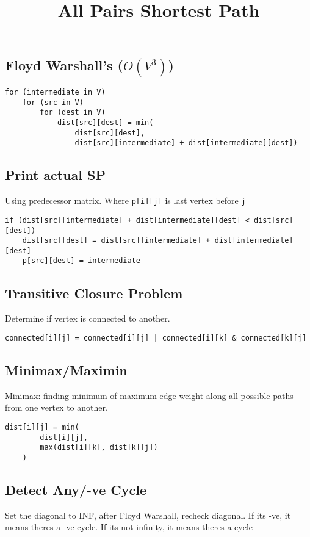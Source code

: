 \documentclass[12pt]{article}
\title{\textbf{All Pairs Shortest Path}}
\date{}
\begin{document}
\maketitle

\begin{spacing}{1.5}

\section{Floyd Warshall's ($O(V^3)$)}

\begin{verbatim}
for (intermediate in V)
    for (src in V)
        for (dest in V)
            dist[src][dest] = min(
                dist[src][dest], 
                dist[src][intermediate] + dist[intermediate][dest])
\end{verbatim}

\subsection{Print actual SP}

Using predecessor matrix. Where \texttt{p[i][j]} is last vertex before \texttt{j}

\begin{verbatim}
if (dist[src][intermediate] + dist[intermediate][dest] < dist[src][dest])
    dist[src][dest] = dist[src][intermediate] + dist[intermediate][dest]
    p[src][dest] = intermediate
\end{verbatim}

\subsection{Transitive Closure Problem}

Determine if vertex is connected to another. 

\begin{verbatim}
connected[i][j] = connected[i][j] | connected[i][k] & connected[k][j]
\end{verbatim}

\subsection{Minimax/Maximin}

Minimax: finding minimum of maximum edge weight along all possible paths from one vertex to another. 

\begin{verbatim}
dist[i][j] = min(
        dist[i][j],
        max(dist[i][k], dist[k][j])
    )
\end{verbatim}

\subsection{Detect Any/-ve Cycle}

Set the diagonal to INF, after Floyd Warshall, recheck diagonal. If its -ve, it means theres a -ve cycle. If its not infinity, it means theres a cycle



\end{spacing}
\end{document}
